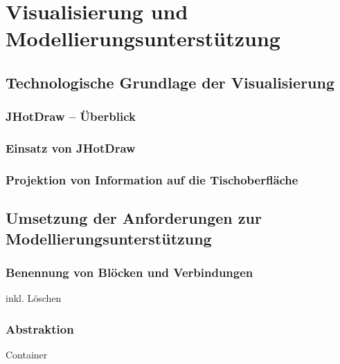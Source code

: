 \chapter{Visualisierung und Modellierungsunterstützung} %
\label{cha:visualisierung_und_modellierungsunterstützung}

\section{Technologische Grundlage der Visualisierung} %
\label{sec:technologische_grundlage_der_visualisierung}

\subsection{JHotDraw – Überblick} %
\label{sub:jhotdraw_Überblick}

\subsection{Einsatz von JHotDraw} %
\label{sub:einsatz_von_jhotdraw}

\subsection{Projektion von Information auf die Tischoberfläche} %
\label{sub:projektion_von_information_auf_die_tischoberfläche}


\section{Umsetzung der Anforderungen zur Modellierungsunterstützung} %
\label{sec:umsetzung_der_anforderungen_zur_modellierungsunterstützung}

\subsection{Benennung von Blöcken und Verbindungen} %
\label{sub:benennung_von_blöcken_und_verbindungen}
inkl. Löschen


\subsection{Abstraktion} %
\label{sub:abstraktion}
Container

